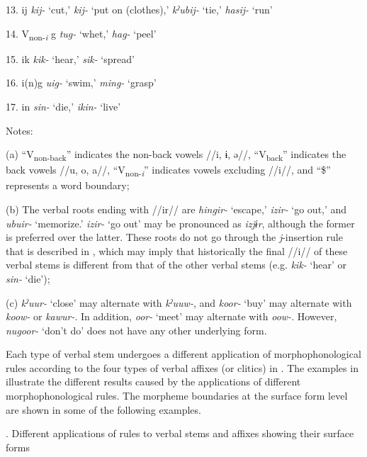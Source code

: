 13.  ij  \textit{kij-} ‘cut,’ \textit{kij-} ‘put on (clothes),’ \textit{kˀubij-} ‘tie,’ \textit{hasij-} ‘run’

14.  V\textsubscript{non-}\textit{\textsubscript{i} }g  \textit{tug-} ‘whet,’ \textit{hag-} ‘peel’

15.  ik  \textit{kik-} ‘hear,’ \textit{sik-} ‘spread’

16.  i(n)g  \textit{uig-} ‘swim,’ \textit{ming-} ‘grasp’

17.  in  \textit{sin-} ‘die,’ \textit{ikin-} ‘live’

Notes:

(a) “V\textsubscript{non-back}” indicates the non-back vowels //i, ɨ, ə//, “V\textsubscript{back}” indicates the back vowels //u, o, a//, “V\textsubscript{non-}\textit{\textsubscript{i}}” indicates vowels excluding //i//, and “\$” represents a word boundary;

(b) The verbal roots ending with //ir// are \textit{hingir-} ‘escape,’ \textit{izir-} ‘go out,’ and \textit{ubuir-} ‘memorize.’ \textit{izir-} ‘go out’ may be pronounced as \textit{izjɨr}, although the former is preferred over the latter. These roots do not go through the \textit{j}{}-insertion rule that is described in , which may imply that historically the final //i// of these verbal stems is different from that of the other verbal stems (e.g. \textit{kik-} ‘hear’ or \textit{sin-} ‘die’);

\begin{styleFootnote}
(c) \textit{kˀuur-} ‘close’ may alternate with \textit{kˀuuw-}, and \textit{koor-} ‘buy’ may alternate with \textit{koow-} or \textit{kawur-}. In addition, \textit{oor-} ‘meet’ may alternate with \textit{oow-}. However, \textit{nugoor-} ‘don’t do’ does not have any other underlying form.
\end{styleFootnote}

Each type of verbal stem undergoes a different application of morphophonological rules according to the four types of verbal affixes (or clitics) in . The examples in  illustrate the different results caused by the applications of different morphophonological rules. The morpheme boundaries at the surface form level are shown in some of the following examples.

\begin{styleBeschriftung}
\textmd{}\textmd{. Different applications of rules to verbal stems and affixes showing their surface forms}
\end{styleBeschriftung}

